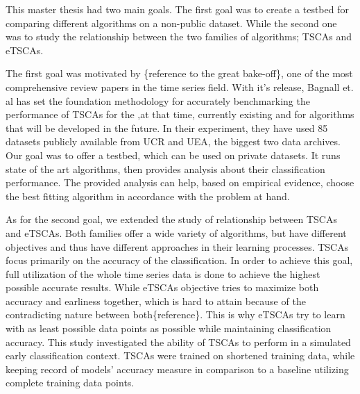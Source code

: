 This master thesis had two main goals.
The first goal was to create a testbed for comparing different algorithms on a non-public dataset.
While the second one was to study the relationship between the two families of algorithms; TSCAs and eTSCAs.\newline

The first goal was motivated by \{reference to the great bake-off\}, one of the most comprehensive review papers in the time series field.
With it's release, Bagnall et. al has set the foundation methodology for accurately benchmarking the performance of TSCAs for the ,at that time, currently existing and for algorithms that will be developed in the future.
In their experiment, they have used 85 datasets publicly available from UCR and UEA, the biggest two data archives.
Our goal was to offer a testbed, which can be used on private datasets. It runs state of the art algorithms, then provides analysis about their classification performance.
The provided analysis can help, based on empirical evidence, choose the best fitting algorithm in accordance with the problem at hand.\newline

As for the second goal, we extended the study of relationship between TSCAs and eTSCAs.
Both families offer a wide variety of algorithms, but have different objectives and thus have different approaches in their learning processes.
TSCAs focus primarily on the accuracy of the classification. In order to achieve this goal, full utilization of the whole time series data is done to achieve the highest possible accurate results.
While eTSCAs objective tries to maximize both accuracy and earliness together, which is hard to attain because of the contradicting nature between both\{reference\}.
This is why eTSCAs try to learn with as least possible data points as possible while maintaining classification accuracy.
This study investigated the ability of TSCAs to perform in a simulated early classification context.
TSCAs were trained on shortened training data, while keeping record of models' accuracy measure in comparison to a baseline utilizing complete training data points.